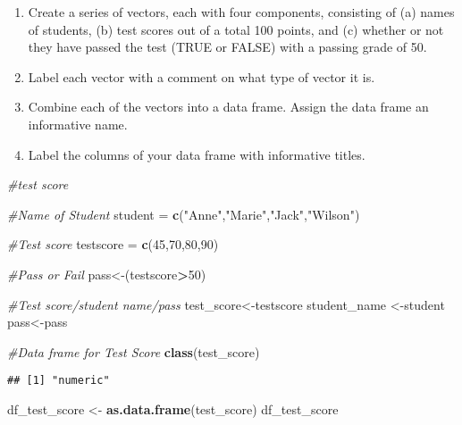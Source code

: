 \documentclass[
]{article}
\newenvironment{Shaded}{\begin{snugshade}}{\end{snugshade}}
\newcommand{\CommentTok}[1]{\textcolor[rgb]{0.56,0.35,0.01}{\textit{#1}}}
\newcommand{\DecValTok}[1]{\textcolor[rgb]{0.00,0.00,0.81}{#1}}
\newcommand{\FunctionTok}[1]{\textcolor[rgb]{0.13,0.29,0.53}{\textbf{#1}}}
\newcommand{\NormalTok}[1]{#1}
\newcommand{\OtherTok}[1]{\textcolor[rgb]{0.56,0.35,0.01}{#1}}
\newcommand{\SpecialCharTok}[1]{\textcolor[rgb]{0.81,0.36,0.00}{\textbf{#1}}}
\newcommand{\StringTok}[1]{\textcolor[rgb]{0.31,0.60,0.02}{#1}}
\begin{document}
\begin{enumerate}
\def\labelenumi{\arabic{enumi}.}
\setcounter{enumi}{4}
\item
  Create a series of vectors, each with four components, consisting of
  (a) names of students, (b) test scores out of a total 100 points, and
  (c) whether or not they have passed the test (TRUE or FALSE) with a
  passing grade of 50.
\item
  Label each vector with a comment on what type of vector it is.
\item
  Combine each of the vectors into a data frame. Assign the data frame
  an informative name.
\item
  Label the columns of your data frame with informative titles.
\end{enumerate}

\begin{Shaded}
\begin{Highlighting}[]
\CommentTok{\#test score}

\CommentTok{\#Name of Student}
\NormalTok{student }\OtherTok{=} \FunctionTok{c}\NormalTok{(}\StringTok{"Anne"}\NormalTok{,}\StringTok{"Marie"}\NormalTok{,}\StringTok{"Jack"}\NormalTok{,}\StringTok{"Wilson"}\NormalTok{)}

\CommentTok{\#Test score}
\NormalTok{testscore }\OtherTok{=} \FunctionTok{c}\NormalTok{(}\DecValTok{45}\NormalTok{,}\DecValTok{70}\NormalTok{,}\DecValTok{80}\NormalTok{,}\DecValTok{90}\NormalTok{)}

\CommentTok{\#Pass or Fail}
\NormalTok{pass}\OtherTok{\textless{}{-}}\NormalTok{(testscore}\SpecialCharTok{\textgreater{}}\DecValTok{50}\NormalTok{)}

\CommentTok{\#Test score/student name/pass}
\NormalTok{test\_score}\OtherTok{\textless{}{-}}\NormalTok{testscore}
\NormalTok{student\_name }\OtherTok{\textless{}{-}}\NormalTok{student}
\NormalTok{pass}\OtherTok{\textless{}{-}}\NormalTok{pass}

\CommentTok{\#Data frame for Test Score}
\FunctionTok{class}\NormalTok{(test\_score)}
\end{Highlighting}
\end{Shaded}

\begin{verbatim}
## [1] "numeric"
\end{verbatim}

\begin{Shaded}
\begin{Highlighting}[]
\NormalTok{df\_test\_score }\OtherTok{\textless{}{-}} \FunctionTok{as.data.frame}\NormalTok{(test\_score)}
\NormalTok{df\_test\_score}
\end{Highlighting}
\end{Shaded}
\end{document}
